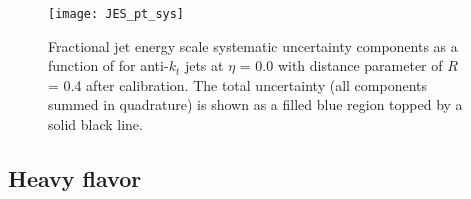 \begin{figure}[htb!]
\centering
\texttt{[image: JES\_pt\_sys]}
\caption{Fractional jet energy scale systematic uncertainty components as a function of \pt for anti-$k_{t}$ jets at $\eta$ = 0.0 
with distance parameter of $R$ = 0.4 after calibration.
The total uncertainty (all components summed in quadrature) is shown as a filled blue region topped by a solid black line.}
\label{fig:exp.JES_pt_sys}
\end{figure} 






\subsection{Heavy flavor}

